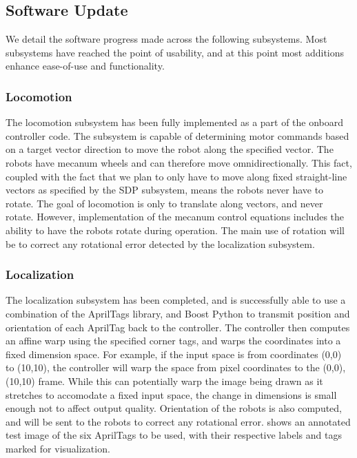 


\subsection{Software Update}
\label{sec:software_progress}
We detail the software progress made across the following subsystems. Most subsystems have reached the point of usability, and at this point most additions enhance ease-of-use and functionality.


\subsubsection{Locomotion}
The locomotion subsystem has been fully implemented as a part of the onboard controller code. The subsystem is capable of determining motor commands based on a target vector direction to move the robot along the specified vector. The robots have mecanum wheels and can therefore move omnidirectionally. This fact, coupled with the fact that we plan to only have to move along fixed straight-line vectors as specified by the SDP subsystem, means the robots never have to rotate. The goal of locomotion is only to translate along vectors, and never rotate. However, implementation of the mecanum control equations includes the ability to have the robots rotate during operation. The main use of rotation will be to correct any rotational error detected by the localization subsystem.

\subsubsection{Localization}
The localization subsystem has been completed, and is successfully able to use a combination of the AprilTags library, and Boost Python to transmit position and orientation of each AprilTag back to the controller. The controller then computes an affine warp using the specified corner tags, and warps the coordinates into a fixed dimension space. For example, if the input space is from coordinates (0,0) to (10,10), the controller will warp the space from pixel coordinates to the (0,0), (10,10) frame. While this can potentially warp the image being drawn as it stretches to accomodate a fixed input space, the change in dimensions is small enough not to affect output quality. Orientation of the robots is also computed, and will be sent to the robots to correct any rotational error.  shows an annotated test image of the six AprilTags to be used, with their respective labels and tags marked for visualization.

